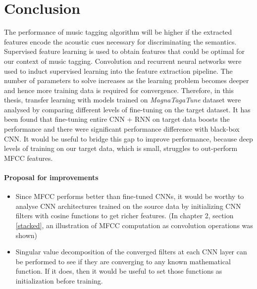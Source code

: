 

\chapter{Conclusion} %

\label{Chapter5}
The performance of music tagging algorithm will be higher if the extracted features encode the acoustic cues necessary for discriminating the semantics. Supervised feature learning is used to obtain features that could be optimal for our context of music tagging. Convolution and recurrent neural networks were used to induct supervised learning into the feature extraction pipeline. The number of parameters to solve increases as the learning problem becomes deeper and hence more training data is required for convergence. Therefore, in this thesis, transfer learning with models trained on \textit{MagnaTagaTune} dataset were analysed by comparing different levels of fine-tuning on the target dataset. It has been found that fine-tuning entire CNN + RNN on target data boosts the performance and there were significant performance difference with black-box CNN. It would be useful to bridge this gap to improve performance, because deep levels of training on our target data, which is small, struggles to out-perform MFCC features.     

\subsubsection{Proposal for improvements}
\begin{itemize}
\setlength\itemsep{0em}
\item Since MFCC performs better than fine-tuned CNNs, it would be worthy to analyse CNN architectures trained on the source data by initializing CNN filters with cosine functions to get richer features. (In chapter 2, section \ref{stacked}, an illustration of MFCC computation as convolution operations was shown)
\item Singular value decomposition of the converged filters at each CNN layer can be performed to see if they are converging to any known mathematical function. If it does, then it would be useful to set those functions as initialization before training.   
\end{itemize}
 

